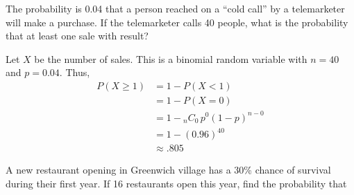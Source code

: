 \documentclass[11pt]{exam}
\renewcommand{\binom}[2]{\ensuremath{{}_{#1}C_{#2}}\,}
\begin{document}
\begin{questions}


\newpage


\question The probability is 0.04 that a person reached on a ``cold call'' by a
telemarketer will make a purchase.  If the telemarketer calls 40 people, what
is the probability that at least one sale with result?

\begin{solution}
Let $X$ be the number of sales.  This is a binomial random variable with $n =
40$ and $p = 0.04$.  Thus,
\begin{align*}
  P(X \geq 1) &= 1 - P(X < 1) \\
    &= 1 - P(X = 0) \\
    &= 1 - \binom{n}{0} p^0 (1-p)^{n-0} \\
    &= 1 - (0.96)^{40} \\
    &\approx .805
\end{align*}
\end{solution}





\question A new restaurant opening in Greenwich village has a 30\% chance of
survival during their first year.  If 16 restaurants open this year, find the
probability that 

\end{questions}
\end{document}
